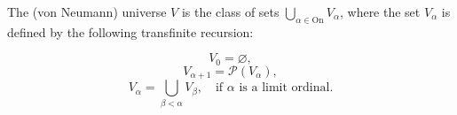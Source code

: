 The (von Neumann) universe $V$ is the class of sets $\bigcup_{\alpha \in \text{On}} V_{\alpha}$, where the set $V_{\alpha}$ is defined by the following transfinite recursion:

$$V_0 = \varnothing,$$
$$V_{\alpha+1} = \mathcal{P}(V_{\alpha}),$$
$$V_{\alpha} = \bigcup_{\beta < \alpha} V_{\beta}, \quad \text{if } \alpha \text{ is a limit ordinal.}$$
